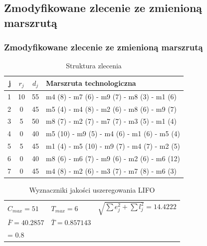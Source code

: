 \documentclass{prezentacja}
\begin{document}
\subsection     {Zmodyfikowane zlecenie ze zmienioną marszrutą}
\label{sec:z2}
\begin{frame}
    \frametitle{Zmodyfikowane zlecenie ze zmienioną marszrutą}
    \begin{table}[htb]
		\centering
		\caption{Struktura zlecenia}
		\scriptsize
		\begin{tabular}{ | r | c | c | l | }
		\hline
		j	& \(r_j\)	& \(d_j\)	& Marszruta technologiczna	\\ \hline
		1	& 10	& 55	& m4 (8) - m7 (6) - m9 (7) - m8 (3) - m1 (6)	\\ \hline
		2	& 0	& 45	& m5 (4) - m4 (8) - m2 (6) - m8 (6) - m9 (7)	\\ \hline
		3	& 5	& 50	& m8 (7) - m2 (7) - m7 (7) - m3 (5) - m1 (4)	\\ \hline
\rowcolor{lightYellow}
		4	& 0	& 40	& m5 (10) - m9 (5) - m4 (6) - m1 (6) - m5 (4)	\\ \hline
		5	& 5	& 45	& m1 (4) - m5 (10) - m9 (7) - m4 (7) - m2 (5)	\\ \hline
		6	& 0	& 40	& m8 (6) - m6 (7) - m9 (6) - m2 (6) - m6 (12)	\\ \hline
\rowcolor{lightYellow}
		7	& 0	& 45	& m4 (8) - m2 (6) - m3 (7) - m7 (8) - m6 (3)	\\ \hline
		\end{tabular}
	\end{table}    
    \begin{table}[htb]
        \caption{Wyznaczniki jakości uszeregowania LIFO}
        \scriptsize
        \centering
        \begin{tabular}{ l l l }
		\(C_{max} = 51 \)	& \( T_{max} = 6 \)	& \( \sqrt{\sum e_j^2 + \sum l_j^2} = 14.4222\)	\\
		\( \bar{F} = 40.2857 \)	& \( \bar{T} = 0.857143 \)	& \( \alpha*\sum e_j + \beta*\sum l_j \Big|_{\substack{\alpha = 0.2\\ \beta = 0.8}} = 9.6 \)	\\ 
        \end{tabular}
    \end{table}
\end{frame}
\end{document}
